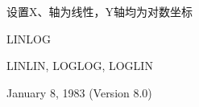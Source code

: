 \label{cmd:linlog}

设置X、轴为线性，Y轴均为对数坐标

LINLOG

LINLIN, LOGLOG, LOGLIN

January 8, 1983 (Version 8.0)

